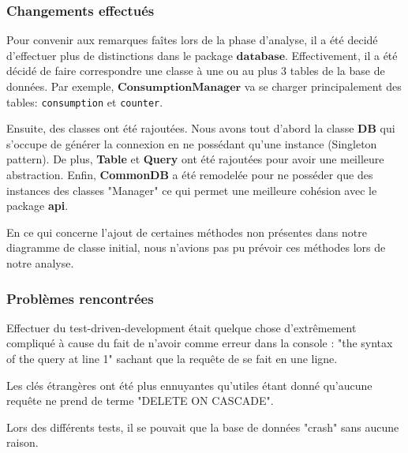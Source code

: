 \subsubsection{Changements effectués}
\begin{flushleft}
    Pour convenir aux remarques faîtes lors de la phase d'analyse, il a été decidé d'effectuer plus de distinctions dans le package $\mathbf{database}$. Effectivement, il a été décidé de faire correspondre une classe à une ou au plus 3 tables de la base de données. Par exemple, $\mathbf{ConsumptionManager}$ va se charger principalement des tables: \texttt{consumption} et \texttt{counter}.
\end{flushleft}
\begin{flushleft}
    Ensuite, des classes ont été rajoutées. Nous avons tout d'abord la classe \textbf{DB} qui s'occupe de générer la connexion en ne possédant qu'une instance (Singleton pattern). De plus, \textbf{Table} et \textbf{Query} ont été rajoutées pour avoir une meilleure abstraction. Enfin, \textbf{CommonDB} a été remodelée pour ne posséder que des instances des classes "Manager" ce qui permet une meilleure cohésion avec le package \textbf{api}.
\end{flushleft}
\begin{flushleft}
    En ce qui concerne l'ajout de certaines méthodes non présentes dans notre diagramme de classe initial, nous n'avions pas pu prévoir ces méthodes lors de notre analyse.
\end{flushleft}

\subsubsection{Problèmes rencontrées}
\begin{flushleft}
    Effectuer du test-driven-development était quelque chose d'extrêmement compliqué à cause du fait de n'avoir comme erreur dans la console : "the syntax of the query at line 1" sachant que la requête de se fait en une ligne. 
\end{flushleft}
\begin{flushleft}
    Les clés étrangères ont été plus ennuyantes qu'utiles étant donné qu'aucune requête ne prend de terme "DELETE ON CASCADE".
\end{flushleft}
\begin{flushleft}
    Lors des différents tests, il se pouvait que la base de données "crash" sans aucune raison.
\end{flushleft}

